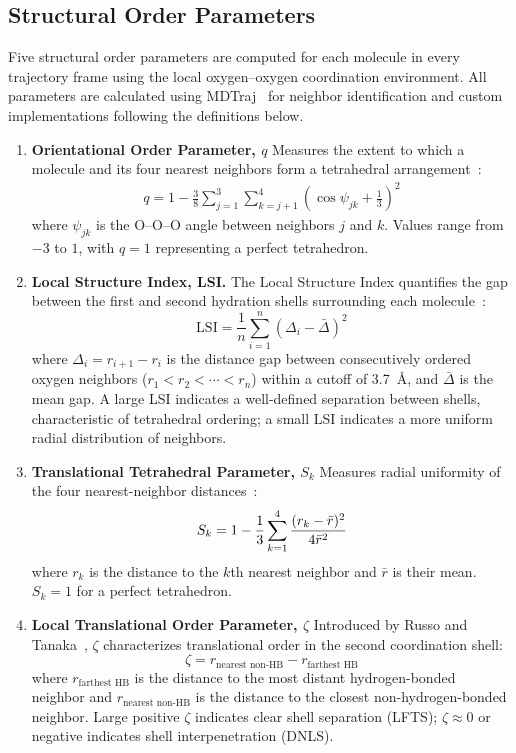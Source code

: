 \documentclass[aps, amsmath,amssymb, reprint, twocolumn,notitlepage,superscriptaddress]{revtex4-2}
\begin{document}
\subsection{Structural Order Parameters}
\label{sec:structural_order_parameter}
Five structural order parameters are computed for each molecule in every trajectory frame using the local oxygen--oxygen coordination environment. All parameters are calculated using MDTraj~\cite{mcgibbon_mdtraj_2015} for neighbor identification and custom implementations following the definitions below.
\begin{enumerate}
\item \textbf{Orientational Order Parameter, $q$}
Measures the extent to which a molecule and its four nearest neighbors form a tetrahedral arrangement~\cite{chau_new_1998, errington_relationship_2001}:
\begin{align}
q= 1 -\frac{3}{8}\sum_{j=1}^3 \sum_{k=j+1}^4{\left(\cos{\psi_{jk}}+ \frac{1}{3}\right)}^2
\end{align}
where $\psi_{jk}$ is the O--O--O angle between neighbors $j$ and $k$. Values range from $-3$ to $1$, with $q=1$ representing a perfect tetrahedron.
\item \textbf{Local Structure Index, LSI.}
The Local Structure Index quantifies the gap between the first and second hydration shells surrounding each molecule~\cite{shiratani_growth_1996}:
\begin{equation}
\text{LSI} = \frac{1}{n}\sum_{i=1}^{n}\left(\Delta_i - \bar{\Delta}\right)^{2}
\label{eq:LSI}
\end{equation}
where $\Delta_i = r_{i+1} - r_i$ is the distance gap between consecutively ordered oxygen neighbors ($r_1 < r_2 < \cdots < r_n$) within a cutoff of 3.7~\AA, and $\bar{\Delta}$ is the mean gap. A large LSI indicates a well-defined separation between shells, characteristic of tetrahedral ordering; a small LSI indicates a more uniform radial distribution of neighbors.
\item \textbf{Translational Tetrahedral Parameter, $S_k$}
Measures radial uniformity of the four nearest-neighbor distances~\cite{duboue-dijon_characterization_2015}:
\begin{align}
S_k= 1 -\frac{1}{3}\sum_{k=1}^4 \frac{(r_k - \Bar{r})^2}{4\Bar{r}^2}
\end{align}
where $r_k$ is the distance to the $k$th nearest neighbor and $\bar{r}$ is their mean. $S_k = 1$ for a perfect tetrahedron.
\item \textbf{Local Translational Order Parameter, $\zeta$}
Introduced by Russo and Tanaka~\cite{russo_understanding_2014}, $\zeta$ characterizes translational order in the second coordination shell:
\begin{equation}
\zeta = r_{\text{nearest non-HB}} - r_{\text{farthest HB}}
\label{eq:zeta}
\end{equation}
where $r_{\text{farthest HB}}$ is the distance to the most distant hydrogen-bonded neighbor and $r_{\text{nearest non-HB}}$ is the distance to the closest non-hydrogen-bonded neighbor. Large positive $\zeta$ indicates clear shell separation (LFTS); $\zeta \approx 0$ or negative indicates shell interpenetration (DNLS).
\end{enumerate}
\end{document}

